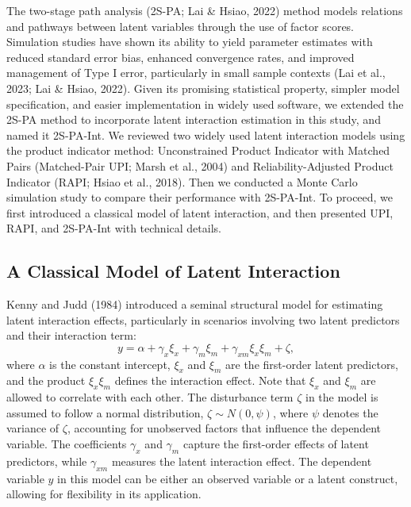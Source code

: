 \documentclass[
  man,mask]{apa6}
\begin{document}
The two-stage path analysis (2S-PA; Lai \& Hsiao, 2022) method models relations and pathways between latent variables through the use of factor scores. Simulation studies have shown its ability to yield parameter estimates with reduced standard error bias, enhanced convergence rates, and improved management of Type I error, particularly in small sample contexts (Lai et al., 2023; Lai \& Hsiao, 2022). Given its promising statistical property, simpler model specification, and easier implementation in widely used software, we extended the 2S-PA method to incorporate latent interaction estimation in this study, and named it 2S-PA-Int. We reviewed two widely used latent interaction models using the product indicator method: Unconstrained Product Indicator with Matched Pairs (Matched-Pair UPI; Marsh et al., 2004) and Reliability-Adjusted Product Indicator (RAPI; Hsiao et al., 2018). Then we conducted a Monte Carlo simulation study to compare their performance with 2S-PA-Int. To proceed, we first introduced a classical model of latent interaction, and then presented UPI, RAPI, and 2S-PA-Int with technical details.

\subsection{A Classical Model of Latent Interaction}\label{a-classical-model-of-latent-interaction}

Kenny and Judd (1984) introduced a seminal structural model for estimating latent interaction effects, particularly in scenarios involving two latent predictors and their interaction term:
\begin{equation}
y = \alpha + \gamma_{x}\xi_{x} + \gamma_{m}\xi_{m} + \gamma_{xm}\xi_{x}\xi_{m} + \zeta,
\end{equation}
where \(\alpha\) is the constant intercept, \(\xi_{x}\) and \(\xi_{m}\) are the first-order latent predictors, and the product \(\xi_{x}\xi_{m}\) defines the interaction effect. Note that \(\xi_{x}\) and \(\xi_{m}\) are allowed to correlate with each other. The disturbance term \(\zeta\) in the model is assumed to follow a normal distribution, \(\zeta \sim N(0, \psi)\), where \(\psi\) denotes the variance of \(\zeta\), accounting for unobserved factors that influence the dependent variable. The coefficients \(\gamma_{x}\) and \(\gamma_{m}\) capture the first-order effects of latent predictors, while \(\gamma_{xm}\) measures the latent interaction effect. The dependent variable \(y\) in this model can be either an observed variable or a latent construct, allowing for flexibility in its application.
\end{document}
